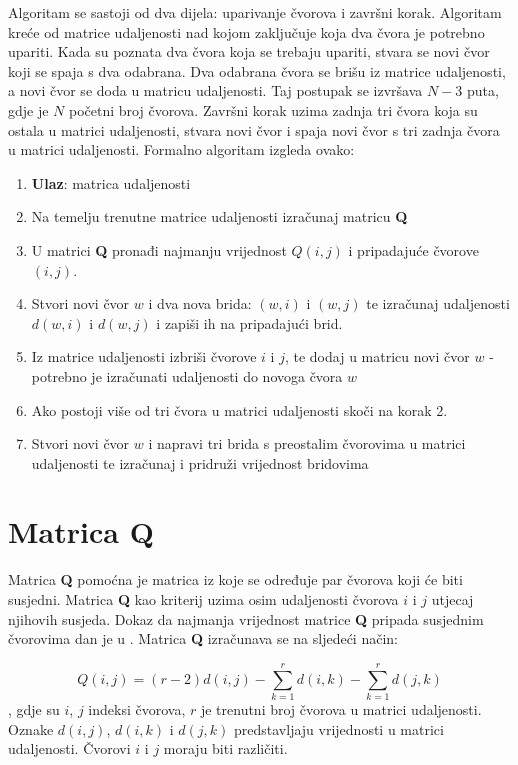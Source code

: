 \documentclass[times, utf8, seminar, numeric]{fer}
\begin{document}
Algoritam se sastoji od dva dijela: uparivanje čvorova i završni korak. Algoritam kreće od matrice udaljenosti nad kojom zaključuje koja dva čvora je potrebno upariti. Kada su poznata dva čvora koja se trebaju upariti, stvara se novi čvor koji se spaja s dva odabrana. Dva odabrana čvora se brišu iz matrice udaljenosti, a novi čvor se doda u matricu udaljenosti. Taj postupak se izvršava $N-3$ puta, gdje je $N$ početni broj čvorova. Završni korak uzima zadnja tri čvora koja su ostala u matrici udaljenosti, stvara novi čvor i spaja novi čvor s tri zadnja čvora u matrici udaljenosti. Formalno algoritam izgleda ovako:
\begin{enumerate}
	\item \textbf{Ulaz}: matrica udaljenosti
	\item Na temelju trenutne matrice udaljenosti izračunaj matricu \textbf{Q}
	\item U matrici \textbf{Q} pronađi najmanju vrijednost $Q(i,j)$ i pripadajuće čvorove $(i,j)$.
	\item Stvori novi čvor $w$ i dva nova brida: $(w,i)$ i $(w,j)$ te izračunaj udaljenosti $d(w,i)$ i $d(w,j)$ i zapiši ih na pripadajući brid.
	\item Iz matrice udaljenosti izbriši čvorove $i$ i $j$, te dodaj u matricu novi čvor $w$ - potrebno je izračunati udaljenosti do novoga čvora $w$
	\item Ako postoji više od tri čvora u matrici udaljenosti skoči na korak 2.
	\item Stvori novi čvor $w$ i napravi tri brida s preostalim čvorovima u matrici udaljenosti te izračunaj i pridruži vrijednost bridovima 
\end{enumerate}

\section{Matrica Q}
Matrica \textbf{Q} pomoćna je matrica iz koje se određuje par čvorova koji će biti susjedni. Matrica \textbf{Q} kao kriterij uzima osim udaljenosti čvorova $i$ i $j$ utjecaj njihovih susjeda. Dokaz da najmanja vrijednost matrice \textbf{Q} pripada susjednim čvorovima dan je u \cite{saitou}. Matrica \textbf{Q} izračunava se na sljedeći način:

\begin{equation}
	Q(i,j) = (r-2) d(i,j) - \sum_{k=1}^{r}d(i,k) - \sum_{k=1}^{r}d(j,k)
\end{equation}
, gdje su $i$, $j$ indeksi čvorova, $r$ je trenutni broj čvorova u matrici udaljenosti. Oznake $d(i,j)$, $d(i,k)$ i $d(j,k)$ predstavljaju vrijednosti u matrici udaljenosti. Čvorovi $i$ i $j$ moraju biti različiti.
\end{document}
